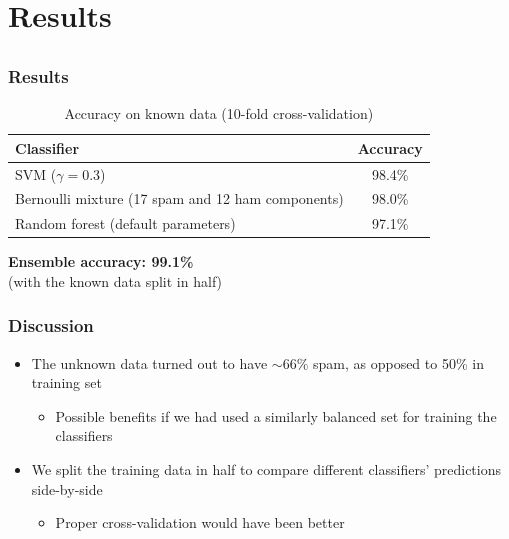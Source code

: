 \documentclass{beamer}
\begin{document}
\section{Results}
\subsection{}
\frame
{
  \frametitle{Results}

{\scriptsize
\begin{table}
\hspace{1.0cm}
\caption{Accuracy on known data (10-fold cross-validation)}
\begin{tabular}{l|c}
Classifier & Accuracy \\ \hline
SVM ($\gamma = 0.3$) & 98.4\% \\
Bernoulli mixture (17 spam and 12 ham components) & 98.0\% \\
Random forest (default parameters) & 97.1\% \\
\end{tabular}
\end{table}
}
\hspace{1.0cm}

{\bf Ensemble accuracy: 99.1\%} \\
(with the known data split in half)
}

\frame
{
    \frametitle{Discussion}
    \begin{itemize}
        \item The unknown data turned out to have $\sim66\%$ spam, as opposed to 50\% in training set
        \begin{itemize}
            \item Possible benefits if we had used a similarly balanced set for training the classifiers
        \end{itemize}
        \item We split the training data in half to compare different classifiers' predictions side-by-side
        \begin{itemize}
            \item Proper cross-validation would have been better
        \end{itemize}
    \end{itemize}
}
\end{document}
